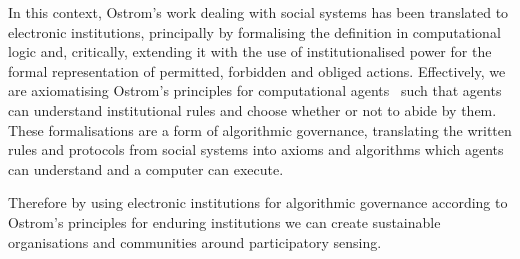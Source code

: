 In this context, Ostrom's work dealing with social systems has been translated to electronic institutions, principally by formalising the
definition in computational logic and, critically, extending it with the use of institutionalised power \citep{Jones1996} for the formal representation of permitted, forbidden and obliged actions.
Effectively, we are axiomatising Ostrom's principles for computational agents~\citep{Pitt2012b} such that agents can understand institutional rules and choose whether or not to abide by them. 
These formalisations are a form of algorithmic governance, translating the written rules and protocols from social systems into axioms and algorithms which agents can understand and a computer can execute.

Therefore by using electronic institutions for algorithmic governance according to Ostrom's principles for enduring institutions we can create sustainable organisations and communities around participatory sensing.















